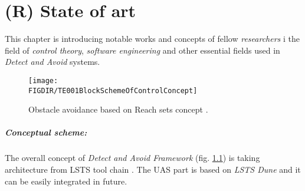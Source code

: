 \chapter{(R) State of art}\label{ch:stateOfArt}

\noindent This  chapter is introducing notable works and concepts of fellow \emph{researchers} i the field of \emph{control theory}, \emph{software engineering} and other essential fields used in \emph{Detect and Avoid} systems.

\begin{figure}[H]
    \centering
    \texttt{[image: \\FIGDIR/TE001BlockSchemeOfControlConcept]} 
    \caption{Obstacle avoidance based on Reach sets concept \cite{gomola2017obstacle}.}
    \label{fig:avoidanceConcept}
\end{figure}

\paragraph{Conceptual scheme:} The overall concept of \emph{Detect and Avoid Framework} (fig. \ref{fig:avoidanceConcept}) is taking architecture from LSTS tool chain \cite{pinto2013lsts,pinto2012implementation}. The UAS part is based on \emph{LSTS Dune} and it can be easily integrated in future. 

